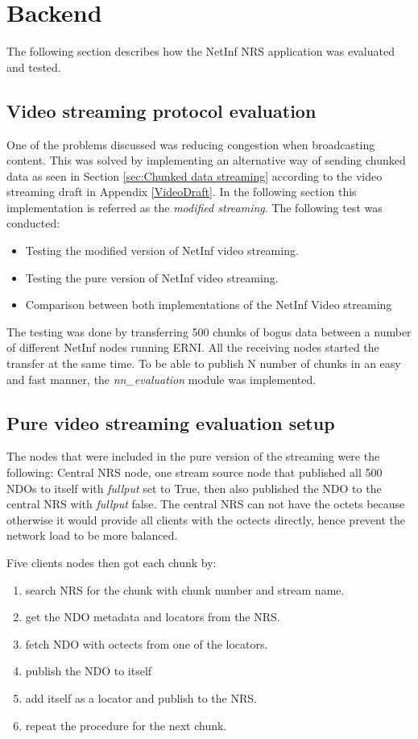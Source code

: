 \section{Backend}

The following section describes how the NetInf NRS application was evaluated and tested. 

\subsection{Video streaming protocol evaluation}
One of the problems discussed was reducing congestion when broadcasting content. This was solved by implementing an alternative way of sending chunked data as seen in Section \ref{sec:Chunked data streaming} according to the video streaming draft in Appendix \ref{VideoDraft}. In the following section this implementation is referred as the \textit{modified streaming}. 
The following test was conducted:

\begin{itemize}
\item Testing the modified version of NetInf video streaming. 
\item Testing the pure version of NetInf video streaming.
\item Comparison between both implementations of the NetInf Video streaming
\end{itemize}

The testing was done by transferring 500 chunks of bogus data between a number of different NetInf nodes running ERNI. All the receiving nodes started the transfer at the same time. To be able to publish N number of chunks in an easy and fast manner, the \textit{nn\_evaluation} module was implemented.

\subsection{Pure video streaming evaluation setup}
The nodes that were included in the pure version of the streaming were the following:
Central NRS node, one stream source node that published all 500 NDOs to itself with \textit{fullput} set to True, then also published the NDO to the central NRS with \textit{fullput} false. The central NRS can not have the octets because otherwise it would provide all clients with the octects directly, hence prevent the network load to be more balanced.

Five clients nodes then got each chunk by:
\begin{enumerate}
\item search NRS for the chunk with chunk number and stream name.
\item get the NDO metadata and locators from the NRS.
\item fetch NDO with octects from one of the locators.
\item publish the NDO to itself 
\item add itself as a locator and publish to the NRS.
\item repeat the procedure for the next chunk.
\end{enumerate}

